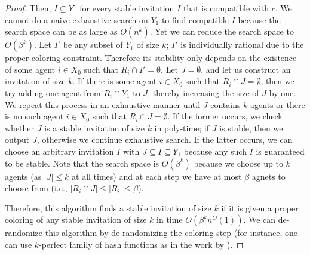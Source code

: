 \begin{proof}
	Then, $I \subseteq Y_1$ for every stable invitation $I$ that is compatible with $c$. We cannot do a naive exhaustive search on $Y_1$ to find compatible $I$ because the search space can be as large as $O(n^k)$. Yet we can reduce the search space to $O(\beta^k)$. Let $I'$ be any subset of $Y_1$ of size $k$; $I'$ is individually rational due to the proper coloring constraint. Therefore its stability only depends on the existence of some agent $i \in X_0$ such that $R_i \cap I' = \emptyset$. Let $J = \emptyset$, and let us construct an invitation of size $k$. If there is some agent $i\in X_0$ such that $R_i \cap J = \emptyset$, then we try adding one agent from $R_i \cap Y_1$ to $J$, thereby increasing the size of $J$ by one. We repeat this process in an exhaustive manner until $J$ contains $k$ agents or there is no such agent $i \in X_0$ such that $R_i \cap J = \emptyset$. If the former occurs, we check whether $J$ is a stable invitation of size $k$ in poly-time; if $J$ is stable, then we output $J$, otherwise we continue exhaustive search. If the latter occurs, we can choose an arbitrary invitation $I$ with $J\subseteq I \subseteq Y_1$ because any such $I$ is guaranteed to be stable. Note that the search space is $O(\beta^k)$ because we choose up to $k$ agents (as $|J| \leq k$ at all times) and at each step we have at most $\beta$ agnets to choose from (i.e., $|R_i \cap J| \leq |R_i| \leq \beta$). 

	Therefore, this algorithm finds a stable invitation of size $k$ if it is given a proper coloring of any stable invitation of size $k$ in time $O(\beta^k n^O(1))$. We can de-randomize this algorithm by de-randomizing the coloring step (for instance, one can use $k$-perfect family of hash functions as in the work by \cite{ColorCoding}).
\end{proof}




